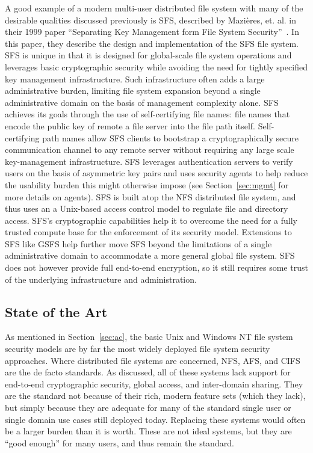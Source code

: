 \documentclass{sig-alternate}
\begin{document}
A good example of a modern multi-user distributed file system with
many of the desirable qualities discussed previously is SFS, described
by Mazi\`{e}res, et. al. in their 1999 paper ``Separating Key
Management form File System Security''~\cite{Mazieres1999}. In this
paper, they describe the design and implementation of the SFS file
system. SFS is unique in that it is designed for global-scale file
system operations and leverages basic cryptographic security while
avoiding the need for tightly specified key management
infrastructure. Such infrastructure often adds a large administrative
burden, limiting file system expansion beyond a single administrative
domain on the basis of management complexity alone. SFS achieves its
goals through the use of self-certifying file names: file names that
encode the public key of remote a file server into the file path
itself. Self-certifying path names allow SFS clients to bootstrap a
cryptographically secure communication channel to any remote server
without requiring any large scale key-management infrastructure. SFS
leverages authentication servers to verify users on the basis of
asymmetric key pairs and uses security agents to help reduce the
usability burden this might otherwise impose (see
Section~\ref{sec:mgmt} for more details on agents). SFS is built atop
the NFS distributed file system, and thus uses an a Unix-based access
control model to regulate file and directory access. SFS's
cryptographic capabilities help it to overcome the need for a fully
trusted compute base for the enforcement of its security
model. Extensions to SFS like GSFS help further move SFS beyond the
limitations of a single administrative domain to accommodate a more
general global file system. SFS does not however provide full
end-to-end encryption, so it still requires some trust of the
underlying infrastructure and administration.

\subsection{State of the Art}

As mentioned in Section~\ref{sec:ac}, the basic Unix and Windows NT
file system security models are by far the most widely deployed file
system security approaches. Where distributed file systems are
concerned, NFS, AFS, and CIFS are the de facto standards. As
discussed, all of these systems lack support for end-to-end
cryptographic security, global access, and inter-domain sharing. They
are the standard not because of their rich, modern feature sets (which
they lack), but simply because they are adequate for many of the
standard single user or single domain use cases still deployed
today. Replacing these systems would often be a larger burden than it
is worth. These are not ideal systems, but they are ``good enough''
for many users, and thus remain the standard.
\end{document}
